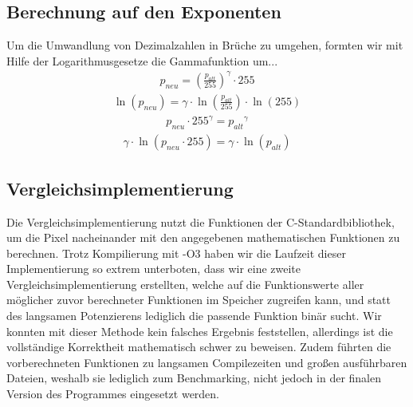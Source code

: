 \documentclass[course=erap]{aspdoc}
\begin{document}
	\subsection{Berechnung auf den Exponenten}
	Um die Umwandlung von Dezimalzahlen in Brüche zu umgehen, formten wir mit Hilfe der Logarithmusgesetze die Gammafunktion um... %
	\begin{align}	
	p_{neu} = \left(\frac{p_{alt}}{255}\right)^{\gamma} \cdot 255
	\end{align}
	\begin{align}	
	\ln (p_{neu}) = \gamma \cdot \ln\left(\frac{p_{alt}}{255}\right) \cdot \ln(255)
	\end{align}
	\begin{align}
	p_{neu} \cdot 255^\gamma = {p_{alt}}^{\gamma}
	\end{align}
	\begin{align}
	\gamma \cdot \ln ( p_{neu} \cdot 255) = \gamma \cdot \ln({p_{alt}})
	\end{align}
	
	\subsection{Vergleichsimplementierung}
	Die Vergleichsimplementierung nutzt die Funktionen der C-Standardbibliothek, um die Pixel nacheinander mit den angegebenen mathematischen Funktionen zu berechnen. Trotz Kompilierung mit -O3 haben wir die Laufzeit dieser Implementierung so extrem unterboten, dass wir eine zweite Vergleichsimplementierung erstellten, welche auf die Funktionswerte aller möglicher zuvor berechneter Funktionen im Speicher zugreifen kann, und statt des langsamen Potenzierens lediglich die passende Funktion binär sucht. Wir konnten mit dieser Methode kein falsches Ergebnis feststellen, allerdings ist die vollständige Korrektheit mathematisch schwer zu beweisen.
	Zudem führten die vorberechneten Funktionen  zu langsamen Compilezeiten und großen ausführbaren Dateien, weshalb sie lediglich zum Benchmarking, nicht jedoch in der finalen Version des Programmes eingesetzt werden.
	
\end{document}
